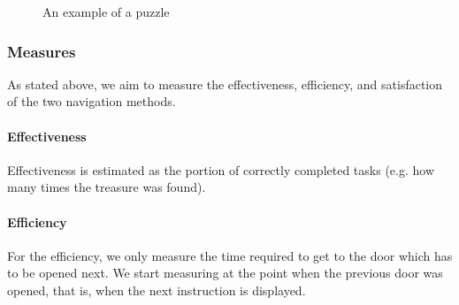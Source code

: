 \documentclass{sig-alternate-05-2015}
\begin{document}
\begin{figure}
\caption{An example of a puzzle}
\end{figure}
\subsubsection{Measures}
As stated above, we aim to measure the effectiveness, efficiency, and satisfaction of the two navigation methods.
\paragraph{Effectiveness} Effectiveness is estimated as the portion of
correctly completed tasks (e.g. how many times the treasure was found).
\paragraph{Efficiency} For the efficiency, we only measure the time required to get to the door which has to be opened next. We start measuring at the point
when the previous door was opened, that is, when the next instruction is displayed.
\end{document}
